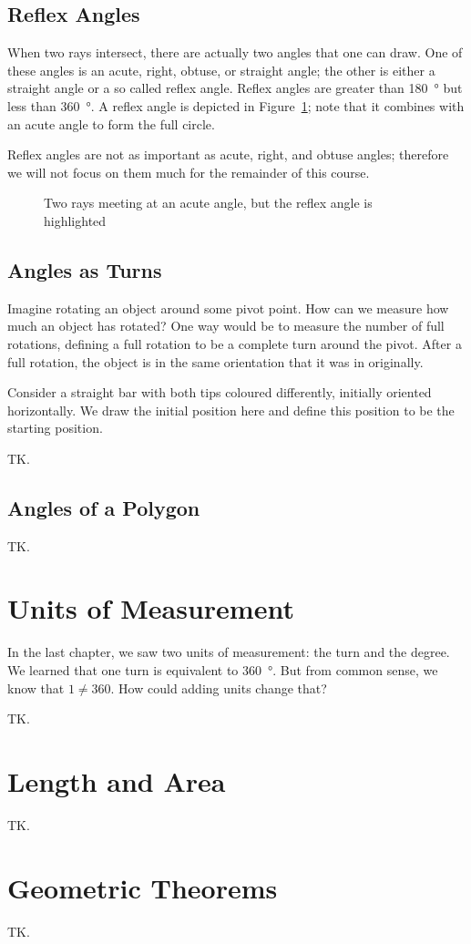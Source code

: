 \documentclass[a4paper,10pt]{report}
\begin{document}
\section{Reflex Angles}

When two rays intersect, there are actually two angles that one can draw. One of
these angles is an acute, right, obtuse, or straight angle; the other is either
a straight angle or a so called \gls{reflex angle}. Reflex angles are greater
than \SI{180}{\degree} but less than \SI{360}{\degree}. A reflex angle is
depicted in Figure~\ref{an:tworaysreflex}; note that it combines with an acute
angle to form the full circle.

Reflex angles are not as important as acute, right, and obtuse angles; therefore
we will not focus on them much for the remainder of this course.

\begin{figure}

 \caption{Two rays meeting at an acute angle, but the reflex angle is
 highlighted}
 \label{an:tworaysreflex}
\end{figure}

\section{Angles as Turns}

Imagine rotating an object around some pivot point. How can we measure how much
an object has rotated? One way would be to measure the number of full rotations,
defining a full rotation to be a complete turn around the pivot. After a full
rotation, the object is in the same orientation that it was in originally.

Consider a straight bar with both tips coloured differently, initially oriented
horizontally. We draw the initial position here and define this position to be
the starting position.

TK.

\section{Angles of a Polygon}

TK.

\chapter{Units of Measurement}

In the last chapter, we saw two units of measurement: the turn and the degree.
We learned that one turn is equivalent to \SI{360}{\degree}. But from common
sense, we know that \(1 \ne 360\). How could adding units change that?

TK.

\chapter{Length and Area}

TK.

\chapter{Geometric Theorems}

TK.


\printglossaries

\cleardoublepage
{}
\listoffigures
\end{document}
